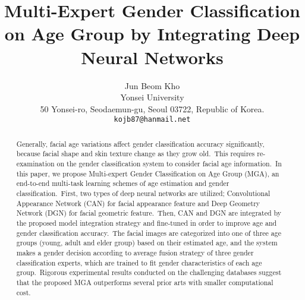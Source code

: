 \documentclass[10pt,twocolumn,letterpaper]{article}
\begin{document}
\title{Multi-Expert Gender Classification on Age Group by Integrating Deep Neural Networks}

\author{Jun Beom Kho\\
Yonsei University\\
50 Yonsei-ro, Seodaemun-gu, Seoul 03722, Republic of Korea.\\
{\tt\small kojb87@hanmail.net}
}

\maketitle

\begin{abstract}
    Generally, facial age variations affect gender classification accuracy significantly, because facial shape and skin texture change as they grow old.~This requires re-examination on the gender classification system to consider facial age information.~In this paper, we propose Multi-expert Gender Classification on Age Group (MGA), an end-to-end multi-task learning schemes of age estimation and gender classification.~First, two types of deep neural networks are utilized; Convolutional Appearance Network (CAN) for facial appearance feature and Deep Geometry Network (DGN) for facial geometric feature.~Then, CAN and DGN are integrated by the proposed model integration strategy and fine-tuned in order to improve age and gender classification accuracy.~The facial images are categorized into one of three age groups (young, adult and elder group) based on their estimated age, and the system makes a gender decision according to average fusion strategy of three gender classification experts, which are trained to fit gender characteristics of each age group.~Rigorous experimental results conducted on the challenging databases suggest that the proposed MGA outperforms several prior arts with smaller computational cost.
\end{abstract}
\end{document}
